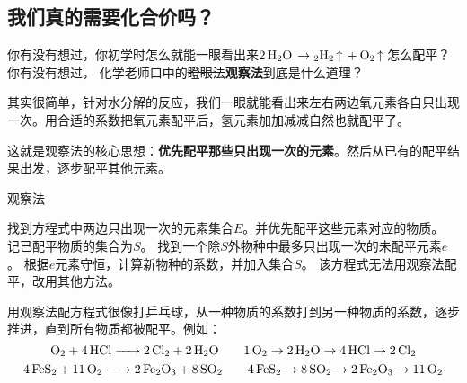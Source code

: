 \documentclass{ctexart}
\begin{document}
\subsection[我们真的需要化合价吗？]{我们真的需要化合价吗？
\supercite{BalancingChemicalEquations1997,SimplerMethodChemical1986}}

你有没有想过，你初学时怎么就能一眼看出来\(\ce{2H2O \to 2H2 ^ + O2 ^}\)怎么配平？你有没有想过，
化学老师口中的\sout{瞪眼法}\textbf{观察法}到底是什么道理？

其实很简单，针对水分解的反应，我们一眼就能看出来左右两边氧元素各自只出现一次。用合适的系数把氧元素配平后，氢元素加加减减自然也就配平了。

这就是观察法的核心思想：\textbf{优先配平那些只出现一次的元素}。然后从已有的配平结果出发，逐步配平其他元素。

\begin{algorithm}[H]
    \caption{观察法}
    \label{alg:inspection}
    \begin{algorithmic}[1]
        \State 找到方程式中两边只出现一次的元素集合\(E\)。并优先配平这些元素对应的物质。
        \State 记已配平物质的集合为\(S\)。
        \State 找到一个除\(S\)外物种中最多只出现一次的未配平元素\(e\)。
        \State 根据\(e\)元素守恒，计算新物种的系数，并加入集合\(S\)。
        \Else
        \State 该方程式无法用观察法配平，改用其他方法。
        \EndIf
        \EndWhile
    \end{algorithmic}
\end{algorithm}

用观察法配方程式很像打乒乓球，从一种物质的系数打到另一种物质的系数，逐步推进，直到所有物质都被配平。例如：
\[
    \ce{O2 + 4 HCl -> 2 Cl2 + 2 H2O} \qquad \ce{1O2} \to \ce{2H2O} \to
    \ce{4HCl} \to \ce{2Cl2}
\]
\[
    \ce{4FeS2 + 11O2 -> 2Fe2O3 + 8SO2} \qquad \ce{4FeS2} \to \ce{8SO2} \to
    \ce{2Fe2O3} \to \ce{11O2}
\]
\end{document}
